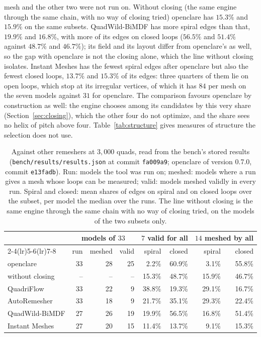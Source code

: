 \documentclass[11pt,a4paper]{article}
\begin{document}
mesh and the other two were not run on. Without closing (the same engine
through the same chain, with no way of closing tried) openclare has
$15.3\%$ and $15.9\%$ on the same subsets. QuadWild-BiMDF has more spiral
edges than that, $19.9\%$ and $16.8\%$, with more of its edges on closed
loops ($56.5\%$ and $51.4\%$ against $48.7\%$ and $46.7\%$); its field and
its layout differ from openclare's as well, so the gap with openclare is not
the closing alone, which the line without closing isolates. Instant Meshes
has the fewest spiral edges after openclare but also the fewest closed
loops, $13.7\%$ and $15.3\%$ of its edges: three quarters of them lie on
open loops, which stop at its irregular vertices, of which it has $84$ per
mesh on the seven models against $31$ for openclare. The comparison favours
openclare by construction as well: the engine chooses among its candidates
by this very share (Section~\ref{sec:closing}), which the other four do not
optimize, and the share sees no helix of pitch above four.
Table~\ref{tab:structure} gives measures of structure the selection does not
use.

\begin{table}[t]
\centering
\small
\setlength{\tabcolsep}{4pt}
\begin{tabular}{lrrrrrrr}
\toprule
& \multicolumn{3}{c}{models of $33$} & \multicolumn{2}{c}{$7$ valid for all}
& \multicolumn{2}{c}{$14$ meshed by all} \\
\cmidrule(lr){2-4}\cmidrule(lr){5-6}\cmidrule(lr){7-8}
& run & meshed & valid & spiral & closed & spiral & closed \\
\midrule
openclare & 33 & 28 & 25 & 2.2\% & 60.9\% & 3.1\% & 55.8\% \\
\quad without closing & -- & -- & -- & 15.3\% & 48.7\% & 15.9\% & 46.7\% \\
QuadriFlow & 33 & 22 & 9 & 38.8\% & 19.3\% & 29.1\% & 16.7\% \\
AutoRemesher & 33 & 18 & 9 & 21.7\% & 35.1\% & 29.3\% & 22.4\% \\
QuadWild-BiMDF & 27 & 26 & 19 & 19.9\% & 56.5\% & 16.8\% & 51.4\% \\
Instant Meshes & 27 & 20 & 15 & 11.4\% & 13.7\% & 9.1\% & 15.3\% \\
\bottomrule
\end{tabular}
\caption{Against other remeshers at $3{,}000$ quads, read from the bench's
stored results (\nolinkurl{bench/results/results.json} at commit
\texttt{fa009a9}; openclare of version 0.7.0, commit \texttt{e13fadb}). Run:
models the tool was run on; meshed: models where a run gives a mesh whose
loops can be measured; valid: models meshed validly in every run. Spiral and
closed: mean shares of edges on spiral and on closed loops over the subset,
per model the median over the runs. The line without closing is the same
engine through the same chain with no way of closing tried, on the models of
the two subsets only.}
\label{tab:remeshers}
\end{table}
\end{document}
